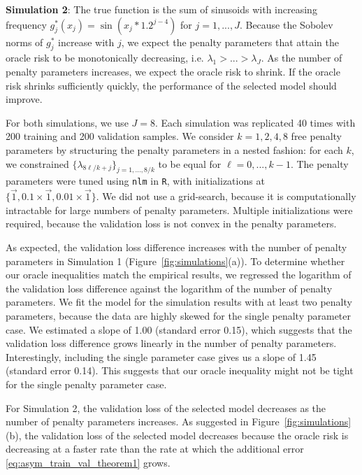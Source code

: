 \documentclass[12pt]{article} %
\theoremstyle{definition}
\begin{document}
\noindent \textbf{Simulation 2}: The true function is the sum of sinusoids with increasing frequency
$g_j^*(x_j) = \sin(x_j * 1.2^{j - 4})$ for $j = 1,...,J$.
Because the Sobolev norms of $g_j^*$ increase with $j$, we expect the penalty parameters that attain the oracle risk to be monotonically decreasing, i.e. ${\lambda}_1 > ... > {\lambda}_J$.
As the number of penalty parameters increases, we expect the oracle risk to shrink.
If the oracle risk shrinks sufficiently quickly, the performance of the selected model should improve.

For both simulations, we use $J = 8$.
Each simulation was replicated 40 times with 200 training and 200 validation samples.
We consider $k = 1, 2, 4, 8$ free penalty parameters by structuring the penalty parameters in a nested fashion: for each $k$, we constrained $\{\lambda_{8\ell/k + j} \}_{j = 1,...,8/k}$ to be equal for $\ell= 0,...,k - 1$.
The penalty parameters were tuned using \texttt{nlm} in \texttt{R}, with initializations at $\{\vec{1}, 0.1 \times \vec{1}, 0.01 \times \vec{1}\}$.
We did not use a grid-search, because it is computationally intractable for large numbers of penalty parameters.
Multiple initializations were required, because the validation loss is not convex in the penalty parameters.

As expected, the validation loss difference increases with the number of penalty parameters in Simulation 1 (Figure~\ref{fig:simulations}(a)).
To determine whether our oracle inequalities match the empirical results, we regressed the logarithm of the validation loss difference against the logarithm of the number of penalty parameters.
We fit the model for the simulation results with at least two penalty parameters, because the data are highly skewed for the single penalty parameter case.
We estimated a slope of 1.00 (standard error 0.15), which suggests that the validation loss difference grows linearly in the number of penalty parameters.
Interestingly, including the single parameter case gives us a slope of 1.45 (standard error 0.14).
This suggests that our oracle inequality might not be tight for the single penalty parameter case.

For Simulation 2, the validation loss of the selected model decreases as the number of penalty parameters increases.
As suggested in Figure~\ref{fig:simulations}(b), the validation loss of the selected model decreases because the oracle risk is decreasing at a faster rate than the rate at which the additional error \eqref{eq:asym_train_val_theorem1} grows.
\end{document}

